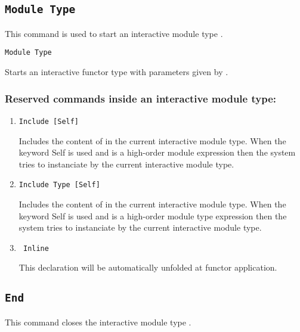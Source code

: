 \subsection{\tt Module Type {\ident}
}

This command is used to start an interactive module type {\ident}.

\begin{Variants}

\item{\tt Module Type {\ident} {\modbindings}}

  Starts an interactive functor type with parameters given by {\modbindings}.

\end{Variants}
\subsubsection{Reserved commands inside an interactive module type:
}
\begin{enumerate}
\item {\tt Include [Self] {\modexpr}}

 Includes the content of {\modexpr} in the current interactive module type. When the keyword Self 
 is used and {\modexpr} is a high-order module expression then the system tries to instanciate {\modexpr}
 by the current interactive module type.

\item {\tt Include Type [Self] {\modtype}}

 Includes the content of {\modtype} in the current interactive module type. When the keyword Self 
 is used and {\modtype} is a high-order module type expression then the system tries to instanciate {\modtype}
 by the current interactive module type.

\item {\tt {\declarationkeyword} Inline {\assums} }

 This declaration will be automatically unfolded at functor application.

\end{enumerate}
\subsection{\tt End {\ident}
}

This command closes the interactive module type {\ident}.

\begin{ErrMsgs}
\item {}
\end{ErrMsgs}


